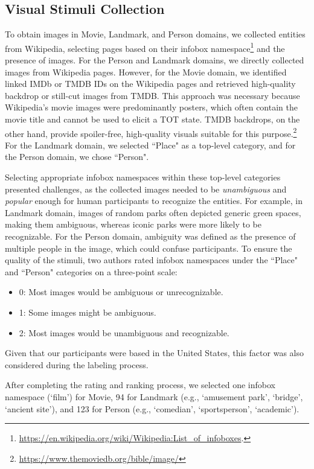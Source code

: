 \subsection{Visual Stimuli Collection}

To obtain images in Movie, Landmark, and Person domains, we collected entities from Wikipedia, selecting pages based on their infobox namespace\footnote{\url{https://en.wikipedia.org/wiki/Wikipedia:List_of_infoboxes}.} and the presence of images. 
For the Person and Landmark domains, we directly collected images from Wikipedia pages. However, for the Movie domain, we identified linked IMDb or TMDB IDs on the Wikipedia pages and retrieved high-quality backdrop or still-cut images from TMDB. This approach was necessary because Wikipedia’s movie images were predominantly posters, which often contain the movie title and cannot be used to elicit a TOT state. TMDB backdrops, on the other hand, provide spoiler-free, high-quality visuals suitable for this purpose.\footnote{\url{https://www.themoviedb.org/bible/image/}}
For the Landmark domain, we selected ``Place" as a top-level category, and for the Person domain, we chose ``Person".

Selecting appropriate infobox namespaces within these top-level categories presented challenges, as the collected images needed to be \textit{unambiguous} and \textit{popular} enough for human participants to recognize the entities. For example, in Landmark domain, images of random parks often depicted generic green spaces, making them ambiguous, whereas iconic parks were more likely to be recognizable. 
%
For the Person domain, ambiguity was defined as the presence of multiple people in the image, which could confuse participants.
To ensure the quality of the stimuli, two authors rated infobox namespaces under the ``Place" and ``Person" categories on a three-point scale:
\begin{itemize}
    \item 0: Most images would be ambiguous or unrecognizable.
    \item 1: Some images might be ambiguous.
    \item 2: Most images would be unambiguous and recognizable.
\end{itemize}
Given that our participants were based in the United States, this factor was also considered during the labeling process. 

After completing the rating and ranking process, we selected one infobox namespace (`film') for Movie, 94 for Landmark (e.g., `amusement park', `bridge', `ancient site'), and 123 for Person (e.g., `comedian', `sportsperson', `academic').


